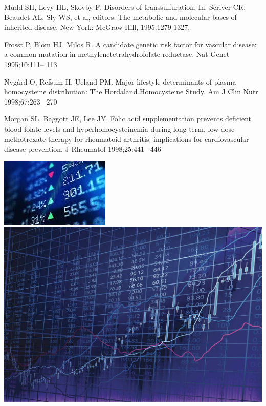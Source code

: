 \documentclass[11pt,a4paper]{report}
\begin{document}
\begin{thebibliography} {}

Mudd SH, Levy HL, Skovby F. Disorders of transsulfuration.
In: Scriver CR, Beaudet AL, Sly WS, et al, editors. The
metabolic and molecular bases of inherited disease. New York:
McGraw-Hill, 1995:1279-1327.

 Frosst P, Blom HJ, Milos R. A candidate genetic risk factor for
vascular disease: a common mutation in
methylenetetrahydrofolate reductase. Nat Genet 1995;10:111–
113

 Nygård O, Refsum H, Ueland PM. Major lifestyle
determinants of plasma homocysteine distribution: The
Hordaland Homocysteine Study. Am J Clin Nutr 1998;67:263–
270

 Morgan SL, Baggott JE, Lee JY. Folic acid supplementation
prevents deficient blood folate levels and
hyperhomocysteinemia during long-term, low dose
methotrexate therapy for rheumatoid arthritis: implications for
cardiovascular disease prevention. J Rheumatol 1998;25:441–
446




\end{thebibliography} 
\newpage
\includegraphics[width=\textwidth]{stock}
\includegraphics[width=\textwidth]{stock3}
\end{document}

